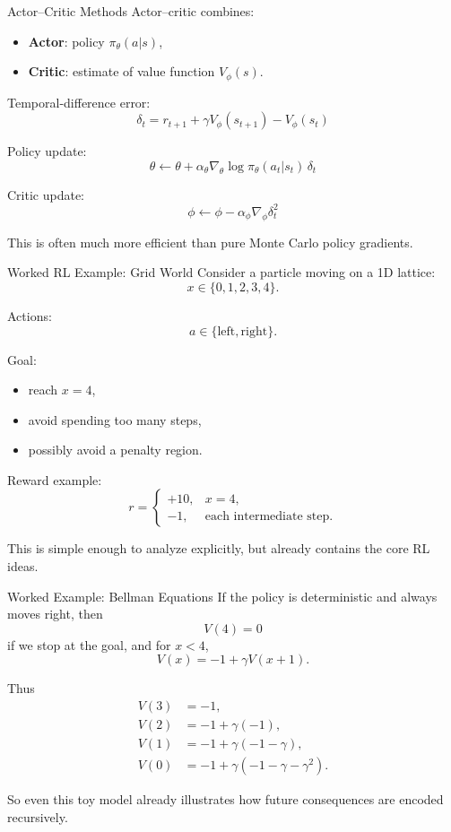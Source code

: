 \documentclass{beamer}
\begin{document}
\begin{frame}{Actor--Critic Methods}
  Actor--critic combines:
  \begin{itemize}
  \item \textbf{Actor}: policy $\pi_\theta(a|s)$,
  \item \textbf{Critic}: estimate of value function $V_\phi(s)$.
  \end{itemize}

  Temporal-difference error:
  \[
  \delta_t=r_{t+1}+\gamma V_\phi(s_{t+1})-V_\phi(s_t)
  \]

  Policy update:
  \[
  \theta \leftarrow \theta + \alpha_\theta
  \nabla_\theta \log \pi_\theta(a_t|s_t)\,\delta_t
  \]

  Critic update:
  \[
  \phi \leftarrow \phi - \alpha_\phi \nabla_\phi \delta_t^2
  \]

  This is often much more efficient than pure Monte Carlo policy gradients.
\end{frame}

\begin{frame}{Worked RL Example: Grid World}
  Consider a particle moving on a 1D lattice:
  \[
  x \in \{0,1,2,3,4\}.
  \]

  Actions:
  \[
  a \in \{\text{left},\text{right}\}.
  \]

  Goal:
  \begin{itemize}
  \item reach $x=4$,
  \item avoid spending too many steps,
  \item possibly avoid a penalty region.
  \end{itemize}

  Reward example:
  \[
  r=
  \begin{cases}
    +10, & x=4,\\
    -1, & \text{each intermediate step}.
  \end{cases}
  \]

  This is simple enough to analyze explicitly, but already contains the core RL ideas.
\end{frame}

\begin{frame}{Worked Example: Bellman Equations}
  If the policy is deterministic and always moves right, then
  \[
  V(4)=0
  \]
  if we stop at the goal, and for $x<4$,
  \[
  V(x)=-1+\gamma V(x+1).
  \]

  Thus
  \begin{align*}
    V(3) &= -1,\\
    V(2) &= -1+\gamma(-1),\\
    V(1) &= -1+\gamma(-1-\gamma),\\
    V(0) &= -1+\gamma(-1-\gamma-\gamma^2).
  \end{align*}

  So even this toy model already illustrates how future consequences are encoded recursively.
\end{frame}
\end{document}
